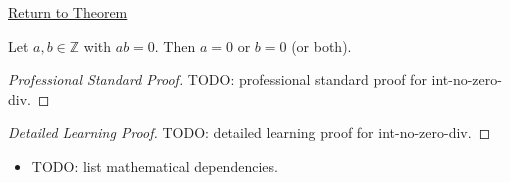 \newpage
{}
\label{prf:int-no-zero-div}

\begin{remark*}[Return]
\hyperref[prop:int-no-zero-div]{Return to Theorem}
\end{remark*}

\begin{theorem*}
Let $a, b \in \mathbb{Z}$ with $ab = 0$. Then $a = 0$ or $b = 0$ (or both).
\end{theorem*}

\begin{proof}[Professional Standard Proof]
\LRAProofBodyStart
TODO: professional standard proof for int-no-zero-div.
\end{proof}

\begin{proof}[Detailed Learning Proof]
\LRAProofBodyStart
TODO: detailed learning proof for int-no-zero-div.
\end{proof}

\begin{remark*}
\end{remark*}

\begin{dependencies}
\begin{itemize}
  \item TODO: list mathematical dependencies.
\end{itemize}
\end{dependencies}

\clearpage
